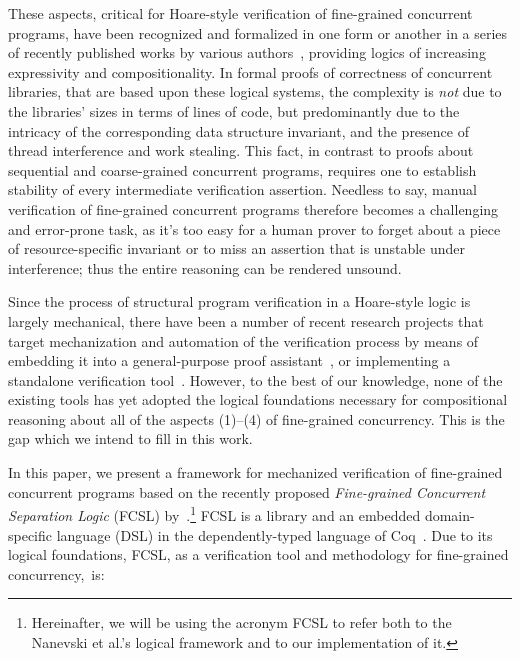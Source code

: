 These aspects, critical for Hoare-style verification of fine-grained
concurrent programs, have been recognized and formalized in one form
or another in a series of recently published works by various
authors~\cite{Feng:POPL09,DinsdaleYoung-al:ECOOP10,Jacobs-Piessens:POPL11,Turon-al:ICFP13,Svendsen-Birkedal:ESOP14,ArrozPincho-al:ECOOP14},
providing logics of increasing expressivity and compositionality.
% 
In formal proofs of correctness of concurrent libraries, that are
based upon these logical systems, the complexity is \emph{not} due to
the libraries' sizes in terms of lines of code, but predominantly due
to the intricacy of the corresponding data structure invariant, and
the presence of thread interference and work stealing. This fact, in
contrast to proofs about sequential and coarse-grained concurrent
programs, requires one to establish stability of every intermediate
verification assertion.
%
Needless to say, manual verification of fine-grained concurrent
programs therefore becomes a challenging and error-prone task, as it's
too easy for a human prover to forget about a piece of
resource-specific invariant or to miss an assertion that is unstable
under interference; thus the entire reasoning can be rendered
unsound. 
%
%

Since the process of structural program verification in a Hoare-style
logic is largely mechanical, there have been a number of recent
research projects that target mechanization and automation of the
verification process by means of embedding it into a general-purpose
proof
assistant~\cite{Nanevski-al:ICFP08,Nanevski-al:POPL10,Shao:CACM10,Chlipala:PLDI11},
or implementing a standalone verification
tool~\cite{Leino-Muller:ESOP09,Cohen-al:TPHOL09,Jacobs-al:NFM11}. However,
to the best of our knowledge, none of the existing tools has yet
adopted the logical foundations necessary for compositional reasoning
about all of the aspects (1)--(4) of fine-grained concurrency. This is
the gap which we intend to fill in this work.

In this paper, we present a framework for mechanized verification of
fine-grained concurrent programs based on the recently proposed
\emph{Fine-grained Concurrent Separation Logic} (FCSL)
by~\citet{Nanevski-al:ESOP14}.\footnote{Hereinafter, we will be using
  the acronym FCSL to refer both to the Nanevski et al.'s logical
  framework and to our implementation of it.}
% 
FCSL is a library and an embedded domain-specific language (DSL) in
the dependently-typed language of
Coq~\cite{Coq-manual}.
% 
Due to its logical foundations, FCSL, as a verification tool and
methodology for fine-grained concurrency,~is:

